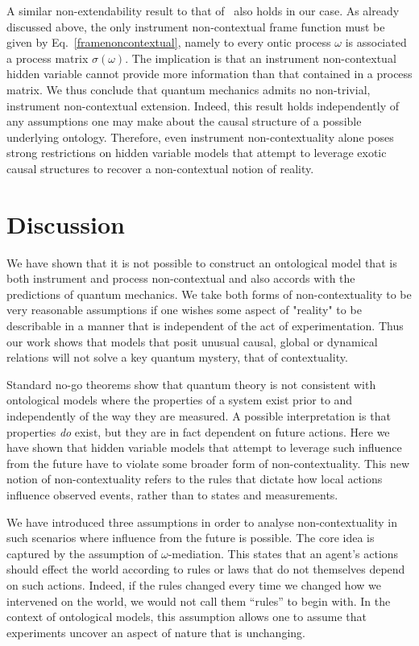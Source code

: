 \documentclass[a4paper,onecolumn,11pt,accepted=2018-05-04]{quantumarticle}
\begin{document}
A similar non-extendability result to that of~\cite{Montina2011} also holds in our case. As already discussed above, the only instrument non-contextual frame function must be given by Eq.~\eqref{framenoncontextual}, namely to every ontic process $\omega$ is associated a process matrix $\sigma\left(\omega\right)$. The implication is that an instrument non-contextual hidden variable cannot provide more information than that contained in a process matrix. We thus conclude that quantum mechanics admits no non-trivial, instrument non-contextual extension. Indeed, this result holds independently of any assumptions one may make about the causal structure of a possible underlying ontology. Therefore, even instrument non-contextuality alone poses strong restrictions on hidden variable models that attempt to leverage exotic causal structures to recover a non-contextual notion of reality.



\section{Discussion}

We have shown that it is not possible to construct an ontological model that is both instrument and process non-contextual and also accords with the predictions of quantum mechanics. We take both forms of non-contextuality to be very reasonable assumptions if one wishes some aspect of "reality" to be describable in a manner that is independent of the act of experimentation. Thus our work shows that models that posit unusual causal, global or dynamical relations will not solve a key quantum mystery, that of contextuality. 

Standard no-go theorems show that quantum theory is not consistent with ontological models where the properties of a system exist prior to and independently of the way they are measured. A possible interpretation is that properties \emph{do} exist, but they are in fact dependent on future actions. Here we have shown that hidden variable models that attempt to leverage such influence from the future have to violate some broader form of non-contextuality. This new notion of non-contextuality refers to the rules that dictate how local actions influence observed events, rather than to states and measurements.

We have introduced three assumptions in order to analyse non-contextuality in such scenarios where influence from the future is possible. The core idea is captured by the assumption of $\omega$-mediation. This states that an agent's actions should effect the world according to rules or laws that do not themselves depend on such actions. %
Indeed, if the rules changed every time we changed how we intervened on the world, we would not call them ``rules'' to begin with. In the context of ontological models, this assumption allows one to assume that experiments uncover an aspect of nature that is unchanging.  
\end{document}
